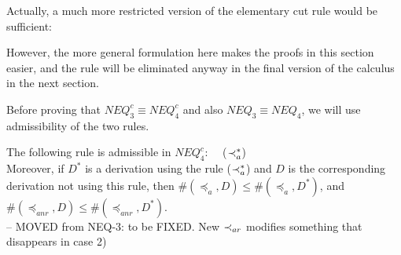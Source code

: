 \begin{REMARK}\label{re:cutx}
Actually, a much more restricted
version of the elementary cut rule would be sufficient: 
\begin{center}  \end{center}
However, the more general formulation here makes
the proofs in this section easier, and the rule will be eliminated anyway in the
final version of the calculus in the next section.
\end{REMARK}
\noindent
Before proving that $NEQ_3^c \equiv NEQ_4^c$ and also $NEQ_3\equiv
NEQ_4$, we will use admissibility of the two rules.
%
\begin{LEMMA}\label{le:inclaad} The following rule is admissible in $NEQ_4^c$:
\ \ ($\mathbin{\prec}_a^*$) \\
Moreover, if $D^*$ is a derivation using the rule ($\mathbin{\prec}_a^*$) and $D$ is the corresponding
derivation not using this rule, then $\#(\preceq_a,D)\leq\#(\preceq_a,D^*)$, and
$\#(\preceq_{anr},D)\leq\#(\preceq_{anr},D^*)$. \\ 
-- MOVED from NEQ-3: to be FIXED. New $\mathbin{\prec}_{ar}$ modifies something that disappears
in case 2)
\end{LEMMA}
